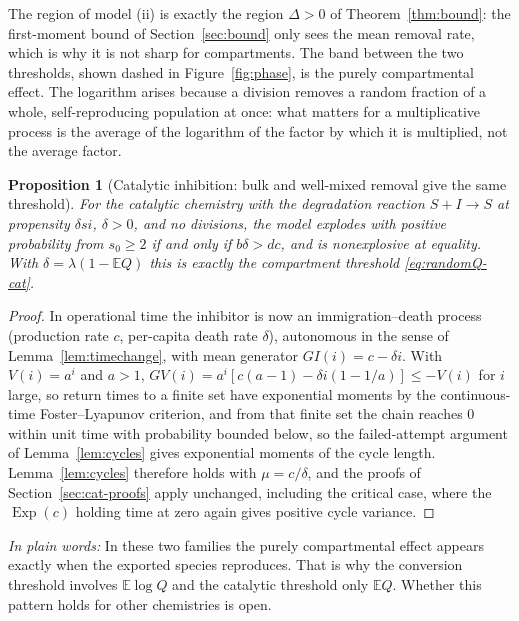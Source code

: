 \documentclass[11pt,a4paper]{article}
\numberwithin{equation}{section}
\newtheorem{proposition}[theorem]{Proposition}
\theoremstyle{definition}\newtheorem{definition}[theorem]{Definition}
\theoremstyle{remark}\newtheorem{remark}[theorem]{Remark}\newtheorem{example}[theorem]{Example}
\newcommand{\E}{\mathbb E}
\newcommand{\Exp}{\operatorname{Exp}}
\newcommand{\takeaway}[1]{\par\smallskip\noindent\textit{In plain words:} #1\par\smallskip}
\begin{document}
The region of model (ii) is exactly the region $\Delta>0$ of Theorem~\ref{thm:bound}: the first-moment bound of Section~\ref{sec:bound} only sees the mean removal rate, which is why it is not sharp for compartments. The band between the two thresholds, shown dashed in Figure~\ref{fig:phase}, is the purely compartmental effect. The logarithm arises because a division removes a random fraction of a whole, self-reproducing population at once: what matters for a multiplicative process is the average of the logarithm of the factor by which it is multiplied, not the average factor.

\begin{proposition}[Catalytic inhibition: bulk and well-mixed removal give the same threshold]\label{prop:massaction}
For the catalytic chemistry with the degradation reaction $S+I\to S$ at propensity $\delta si$, $\delta>0$, and no divisions, the model explodes with positive probability from $s_0\ge2$ if and only if $b\delta>dc$, and is nonexplosive at equality. With $\delta=\lambda(1-\E Q)$ this is exactly the compartment threshold \eqref{eq:randomQ-cat}.
\end{proposition}

\begin{proof}
In operational time the inhibitor is now an immigration--death process (production rate $c$, per-capita death rate $\delta$), autonomous in the sense of Lemma~\ref{lem:timechange}, with mean generator $GI(i)=c-\delta i$. With $V(i)=a^i$ and $a>1$, $GV(i)=a^i[c(a-1)-\delta i(1-1/a)]\le-V(i)$ for $i$ large, so return times to a finite set have exponential moments by the continuous-time Foster--Lyapunov criterion, and from that finite set the chain reaches $0$ within unit time with probability bounded below, so the failed-attempt argument of Lemma~\ref{lem:cycles} gives exponential moments of the cycle length. Lemma~\ref{lem:cycles} therefore holds with $\mu=c/\delta$, and the proofs of Section~\ref{sec:cat-proofs} apply unchanged, including the critical case, where the $\Exp(c)$ holding time at zero again gives positive cycle variance.
\end{proof}

\takeaway{In these two families the purely compartmental effect appears exactly when the exported species reproduces. That is why the conversion threshold involves $\E\log Q$ and the catalytic threshold only $\E Q$. Whether this pattern holds for other chemistries is open.}
\end{document}
